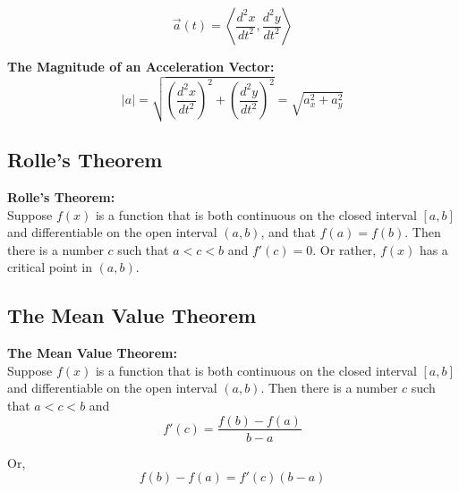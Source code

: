         \begin{equation*}
            \overrightarrow{a}(t) = \left\langle\frac{d^2x}{dt^2},\frac{d^2y}{dt^2}\right\rangle
        \end{equation*}

        \noindent \color{purple} \textbf{The Magnitude of an Acceleration Vector:} \color{black} \\

        \begin{equation*}
            |a| = \sqrt{\left(\frac{d^2x}{dt^2}\right)^2+\left(\frac{d^2y}{dt^2}\right)^2} = \sqrt{a^2_x+a^2_y}
        \end{equation*}



    \subsection{Rolle's Theorem}
        \color{purple} \textbf{Rolle's Theorem:} \color{black} \\
        \noindent Suppose $f(x)$ is a function that is both continuous on the closed interval
        $[a,b]$ and differentiable on the open interval $(a,b)$, and that $f(a)=f(b)$.
        Then there is a number $c$ such that $a<c<b$ and $f'(c)=0$. Or rather, $f(x)$ has a
        critical point in $(a,b)$. \\



    \subsection{The Mean Value Theorem}
        \color{purple} \textbf{The Mean Value Theorem:} \color{black} \\
        \noindent Suppose $f(x)$ is a function that is both continuous on the closed interval
        $[a,b]$ and differentiable on the open interval $(a,b)$. Then there is a number
        $c$ such that $a<c<b$ and \\

        \begin{equation*}
            f'(c) = \frac{f(b)-f(a)}{b-a}
        \end{equation*}

        \noindent Or, \\

        \begin{equation*}
            f(b) - f(a) = f'(c) (b-a)
        \end{equation*}

